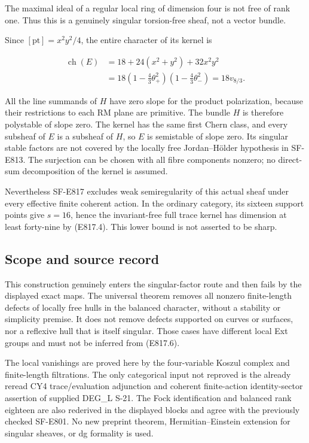 The maximal ideal of a regular local ring of dimension four is not free
of rank one. Thus this is a genuinely singular torsion-free sheaf, not a
vector bundle.

Since \([\mathrm{pt}]=x^2y^2/4\), the entire character of its kernel is

\[
 \begin{split}
 \operatorname{ch}(E)
   &=18+24(x^2+y^2)+32x^2y^2\\
   &=18\left(1-\frac43\theta_+^2\right)
          \left(1-\frac43\theta_-^2\right)
     =18v_{8/3}.
 \end{split}
 \tag{E817.25}
\]

All the line summands of \(H\) have zero slope for the product
polarization, because their restrictions to each RM plane are primitive.
The bundle \(H\) is therefore polystable of slope zero. The kernel has
the same first Chern class, and every subsheaf of \(E\) is a subsheaf of
\(H\), so \(E\) is semistable of slope zero. Its singular stable factors
are not covered by the locally free Jordan--Hölder hypothesis in
SF-E813. The surjection can be chosen with all fibre components nonzero;
no direct-sum decomposition of the kernel is assumed.

Nevertheless SF-E817 excludes weak semiregularity of this actual sheaf
under every effective finite coherent action. In the ordinary category,
its sixteen support points give \(s=16\), hence the invariant-free full
trace kernel has dimension at least forty-nine by (E817.4). This lower
bound is not asserted to be sharp.

\subsection{Scope and source record}\label{SF-E817-scope-and-source-record}

This construction genuinely enters the singular-factor route and then
fails by the displayed exact maps. The universal theorem removes all
nonzero finite-length defects of locally free hulls in the balanced
character, without a stability or simplicity premise. It does not remove
defects supported on curves or surfaces, nor a reflexive hull that is
itself singular. Those cases have different local Ext groups and must
not be inferred from (E817.6).

The local vanishings are proved here by the four-variable Koszul complex
and finite-length filtrations. The only categorical input not reproved
is the already reread CY4 trace/evaluation adjunction and coherent
finite-action identity-sector assertion of supplied DEG\_L S-21. The
Fock identification and balanced rank eighteen are also rederived in the
displayed blocks and agree with the previously checked SF-E801. No new
preprint theorem, Hermitian--Einstein extension for singular sheaves, or
dg formality is used.
